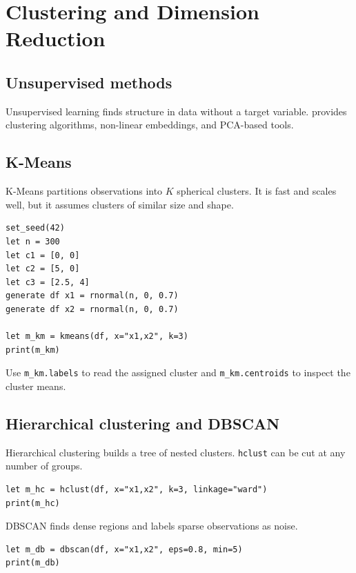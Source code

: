 \chapter{Clustering and Dimension Reduction}

\section{Unsupervised methods}

Unsupervised learning finds structure in data without a target variable.
\hayashi{} provides clustering algorithms, non-linear embeddings, and
PCA-based tools.

\section{K-Means}

K-Means partitions observations into $K$ spherical clusters. It is fast
and scales well, but it assumes clusters of similar size and shape.

\begin{lstlisting}[caption={K-Means}]
set_seed(42)
let n = 300
let c1 = [0, 0]
let c2 = [5, 0]
let c3 = [2.5, 4]
generate df x1 = rnormal(n, 0, 0.7)
generate df x2 = rnormal(n, 0, 0.7)

let m_km = kmeans(df, x="x1,x2", k=3)
print(m_km)
\end{lstlisting}

Use \texttt{m\_km.labels} to read the assigned cluster and \texttt{m\_km.centroids} to
inspect the cluster means.

\section{Hierarchical clustering and DBSCAN}

Hierarchical clustering builds a tree of nested clusters. \texttt{hclust}
can be cut at any number of groups.

\begin{lstlisting}[caption={Hierarchical clustering}]
let m_hc = hclust(df, x="x1,x2", k=3, linkage="ward")
print(m_hc)
\end{lstlisting}

DBSCAN finds dense regions and labels sparse observations as noise.

\begin{lstlisting}[caption={DBSCAN}]
let m_db = dbscan(df, x="x1,x2", eps=0.8, min=5)
print(m_db)
\end{lstlisting}

